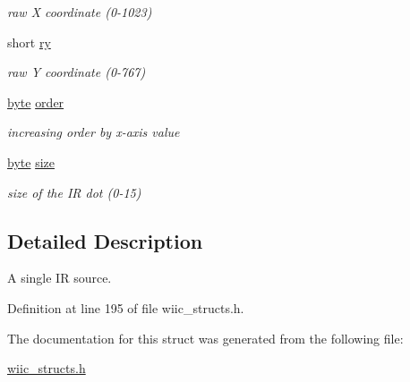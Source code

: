 \begin{DoxyCompactItemize}
\begin{DoxyCompactList}\small\item\em raw X coordinate (0-\/1023) \end{DoxyCompactList}\item 
\hypertarget{structir__dot__t_ab7fb2aacd27c03155935515907b49065}{short \hyperlink{structir__dot__t_ab7fb2aacd27c03155935515907b49065}{ry}}\label{structir__dot__t_ab7fb2aacd27c03155935515907b49065}

\begin{DoxyCompactList}\small\item\em raw Y coordinate (0-\/767) \end{DoxyCompactList}\item 
\hypertarget{structir__dot__t_a729a0f66a1b6ed5ec6caf999934ef44b}{\hyperlink{wiic__macros_8h_a0c8186d9b9b7880309c27230bbb5e69d}{byte} \hyperlink{structir__dot__t_a729a0f66a1b6ed5ec6caf999934ef44b}{order}}\label{structir__dot__t_a729a0f66a1b6ed5ec6caf999934ef44b}

\begin{DoxyCompactList}\small\item\em increasing order by x-\/axis value \end{DoxyCompactList}\item 
\hypertarget{structir__dot__t_a009422c74d8c2a1dcfe64e669cb7aa91}{\hyperlink{wiic__macros_8h_a0c8186d9b9b7880309c27230bbb5e69d}{byte} \hyperlink{structir__dot__t_a009422c74d8c2a1dcfe64e669cb7aa91}{size}}\label{structir__dot__t_a009422c74d8c2a1dcfe64e669cb7aa91}

\begin{DoxyCompactList}\small\item\em size of the I\-R dot (0-\/15) \end{DoxyCompactList}\end{DoxyCompactItemize}


\subsection{Detailed Description}
A single I\-R source. 

Definition at line 195 of file wiic\-\_\-structs.\-h.



The documentation for this struct was generated from the following file\-:\begin{DoxyCompactItemize}
\item 
\hyperlink{wiic__structs_8h}{wiic\-\_\-structs.\-h}\end{DoxyCompactItemize}
